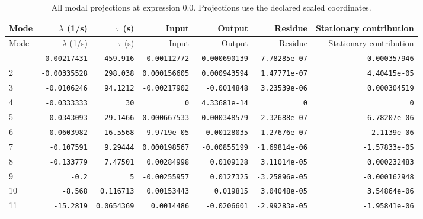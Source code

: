 \begingroup\scriptsize
\setlength{\tabcolsep}{3pt}
\begin{longtable}{lrrrrrr}
\caption{All modal projections at expression 0.0. Projections use the declared scaled coordinates.}\\
\toprule
Mode & $\lambda$ (1/s) & $\tau$ (s) & Input & Output & Residue & Stationary contribution \\
\midrule\endfirsthead
\toprule
Mode & $\lambda$ (1/s) & $\tau$ (s) & Input & Output & Residue & Stationary contribution \\
\midrule\endhead
\bottomrule\endfoot
1 & \texttt{-0.00217431} & \texttt{459.916} & \texttt{0.00112772} & \texttt{-0.000690139} & \texttt{-7.78285e-07} & \texttt{-0.000357946} \\
2 & \texttt{-0.00335528} & \texttt{298.038} & \texttt{0.000156605} & \texttt{0.000943594} & \texttt{1.47771e-07} & \texttt{4.40415e-05} \\
3 & \texttt{-0.0106246} & \texttt{94.1212} & \texttt{-0.00217902} & \texttt{-0.0014848} & \texttt{3.23539e-06} & \texttt{0.000304519} \\
4 & \texttt{-0.0333333} & \texttt{30} & \texttt{0} & \texttt{4.33681e-14} & \texttt{0} & \texttt{0} \\
5 & \texttt{-0.0343093} & \texttt{29.1466} & \texttt{0.000667533} & \texttt{0.000348579} & \texttt{2.32688e-07} & \texttt{6.78207e-06} \\
6 & \texttt{-0.0603982} & \texttt{16.5568} & \texttt{-9.9719e-05} & \texttt{0.00128035} & \texttt{-1.27676e-07} & \texttt{-2.1139e-06} \\
7 & \texttt{-0.107591} & \texttt{9.29444} & \texttt{0.000198567} & \texttt{-0.00855199} & \texttt{-1.69814e-06} & \texttt{-1.57833e-05} \\
8 & \texttt{-0.133779} & \texttt{7.47501} & \texttt{0.00284998} & \texttt{0.0109128} & \texttt{3.11014e-05} & \texttt{0.000232483} \\
9 & \texttt{-0.2} & \texttt{5} & \texttt{-0.00255957} & \texttt{0.0127325} & \texttt{-3.25896e-05} & \texttt{-0.000162948} \\
10 & \texttt{-8.568} & \texttt{0.116713} & \texttt{0.00153443} & \texttt{0.019815} & \texttt{3.04048e-05} & \texttt{3.54864e-06} \\
11 & \texttt{-15.2819} & \texttt{0.0654369} & \texttt{0.0014486} & \texttt{-0.0206601} & \texttt{-2.99283e-05} & \texttt{-1.95841e-06} \\
\end{longtable}
\endgroup


